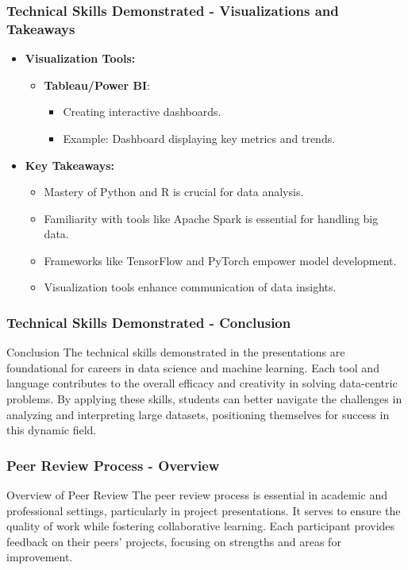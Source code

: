 \documentclass[aspectratio=169]{beamer}
\begin{document}
\begin{frame}[fragile]
  \frametitle{Technical Skills Demonstrated - Visualizations and Takeaways}
  \begin{itemize}
    \item \textbf{Visualization Tools:}
    \begin{itemize}
      \item \textbf{Tableau/Power BI}:
      \begin{itemize}
        \item Creating interactive dashboards.
        \item Example: Dashboard displaying key metrics and trends.
      \end{itemize}
    \end{itemize}
    \item \textbf{Key Takeaways:}
    \begin{itemize}
      \item Mastery of Python and R is crucial for data analysis.
      \item Familiarity with tools like Apache Spark is essential for handling big data.
      \item Frameworks like TensorFlow and PyTorch empower model development.
      \item Visualization tools enhance communication of data insights.
    \end{itemize}
  \end{itemize}
\end{frame}

\begin{frame}[fragile]
  \frametitle{Technical Skills Demonstrated - Conclusion}
  \begin{block}{Conclusion}
    The technical skills demonstrated in the presentations are foundational for careers in data science and machine learning. Each tool and language contributes to the overall efficacy and creativity in solving data-centric problems.
    By applying these skills, students can better navigate the challenges in analyzing and interpreting large datasets, positioning themselves for success in this dynamic field.
  \end{block}
\end{frame}

\begin{frame}[fragile]
  \frametitle{Peer Review Process - Overview}
  \begin{block}{Overview of Peer Review}
    The peer review process is essential in academic and professional settings, particularly in project presentations. It serves to ensure the quality of work while fostering collaborative learning. Each participant provides feedback on their peers' projects, focusing on strengths and areas for improvement.
  \end{block}
\end{frame}
\end{document}
